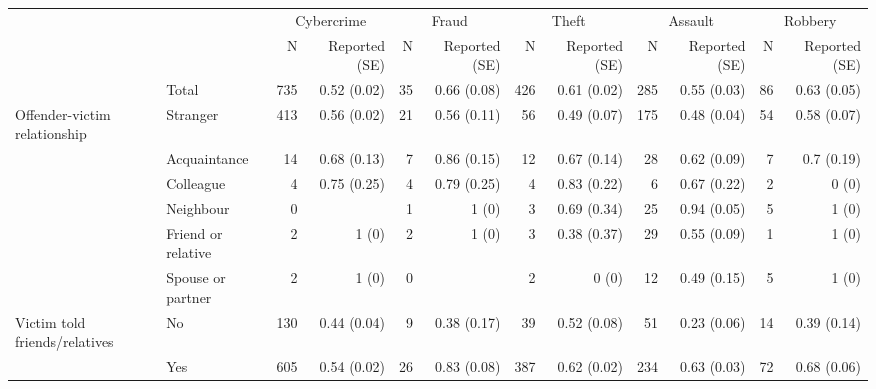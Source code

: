 \begin{tabular}{llrrrrrrrrrr}
	\toprule
	&  & \multicolumn{2}{c}{Cybercrime    } & \multicolumn{2}{c}{Fraud    } & \multicolumn{2}{c}{Theft    } & \multicolumn{2}{c}{Assault    } & \multicolumn{2}{c}{Robbery    } \\ 
	\cmidrule(lr){3-4} \cmidrule(lr){5-6} \cmidrule(lr){7-8} \cmidrule(lr){9-10} \cmidrule(lr){11-12}
	&     & N & Reported (SE) & N  & Reported (SE)  & N   & Reported (SE)   & N    & Reported (SE)    & N     & Reported (SE)     \\ 
	\midrule\addlinespace[2.5pt]
		& Total & 735 & 0.52 (0.02) & 35 & 0.66 (0.08) & 426 & 0.61 (0.02) & 285 & 0.55 (0.03) & 86 & 0.63 (0.05) \\ 
	\midrule
	Offender-victim relationship & Stranger & 413 & 0.56 (0.02) & 21 & 0.56 (0.11) & 56 & 0.49 (0.07) & 175 & 0.48 (0.04) & 54 & 0.58 (0.07) \\ 
	& Acquaintance & 14 & 0.68 (0.13) & 7 & 0.86 (0.15) & 12 & 0.67 (0.14) & 28 & 0.62 (0.09) & 7 & 0.7 (0.19) \\ 
	& Colleague & 4 & 0.75 (0.25) & 4 & 0.79 (0.25) & 4 & 0.83 (0.22) & 6 & 0.67 (0.22) & 2 & 0 (0) \\ 
	& Neighbour & 0 &  & 1 & 1 (0) & 3 & 0.69 (0.34) & 25 & 0.94 (0.05) & 5 & 1 (0) \\ 
	& Friend or relative & 2 & 1 (0) & 2 & 1 (0) & 3 & 0.38 (0.37) & 29 & 0.55 (0.09) & 1 & 1 (0) \\ 
	& Spouse or partner & 2 & 1 (0) & 0 &  & 2 & 0 (0) & 12 & 0.49 (0.15) & 5 & 1 (0) \\ 
	\midrule
	Victim told friends/relatives & No & 130 & 0.44 (0.04) & 9 & 0.38 (0.17) & 39 & 0.52 (0.08) & 51 & 0.23 (0.06) & 14 & 0.39 (0.14) \\ 
	& Yes & 605 & 0.54 (0.02) & 26 & 0.83 (0.08) & 387 & 0.62 (0.02) & 234 & 0.63 (0.03) & 72 & 0.68 (0.06) \\ 
	\bottomrule
\end{tabular}
